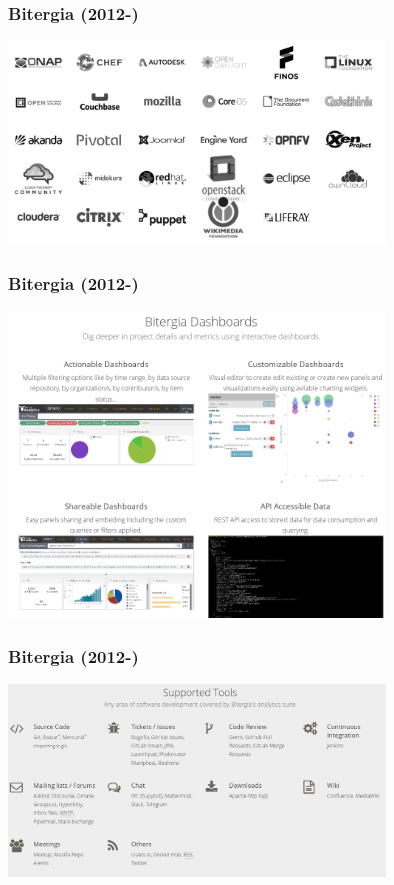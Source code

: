 \documentclass[17pt,aspectratio=169,hyperref=pdfusetitle]{beamer}
\begin{document}
\begin{frame}[fragile]
  \frametitle{Bitergia (2012-)}

  \begin{center}
  \includegraphics[width=10cm]{figs/bitergia-customers}
  \end{center}  
  
\end{frame}

\begin{frame}[fragile]
  \frametitle{Bitergia (2012-)}

  \begin{center}
  \includegraphics[width=10cm]{figs/bitergia-dashboards}
  \end{center}  
  
\end{frame}

\begin{frame}[fragile]
  \frametitle{Bitergia (2012-)}

  \begin{center}
  \includegraphics[width=10cm]{figs/bitergia-tools}
  \end{center}  
  
\end{frame}
\end{document}
